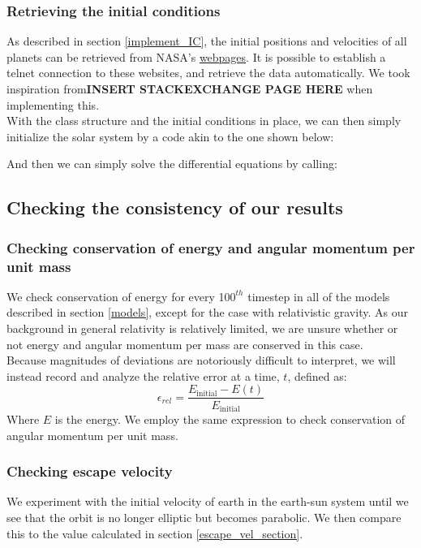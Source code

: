 \documentclass[a4paper, 10pt]{article}
\begin{document}
\subsubsection{Retrieving the initial conditions}
As described in section \ref{implement_IC}, the initial positions and velocities of all planets can be retrieved from NASA's  \href{http://ssd.jpl.nasa.gov/horizons.cgi#top}{webpages}. It is possible to establish a telnet connection to these websites, and retrieve the data automatically. We took inspiration from\textbf{INSERT STACKEXCHANGE PAGE HERE} when implementing this.\\
\linebreak
\linebreak
With the class structure and the initial conditions in place, we can then simply initialize the solar system by a code akin to the one shown below:

And then we can simply solve the differential equations by calling:


\subsection{Checking the consistency of our results}
\subsubsection{Checking conservation of energy and angular momentum per unit mass}
We check conservation of energy for every 10$0^{th}$ timestep in all of the models described in section \ref{models}, except for the case with relativistic gravity. As our background in general relativity is relatively limited, we are unsure whether or not energy and angular momentum per mass are conserved in this case.\\
\linebreak
Because magnitudes of deviations are notoriously difficult to interpret, we will instead record and analyze the relative error at a time, $t$, defined as:
\begin{equation}
\epsilon_{rel}=\frac{E_{\mathrm{initial}}-E(t)}{E_{\mathrm{initial}}}
\end{equation}
Where $E$ is the energy. We employ the same expression to check conservation of angular momentum per unit mass.
\subsubsection{Checking escape velocity}
We experiment with the initial velocity of earth in the earth-sun system until we see that the orbit is no longer elliptic but becomes parabolic. We then compare this to the value calculated in section \ref{escape_vel_section}.
\end{document}
